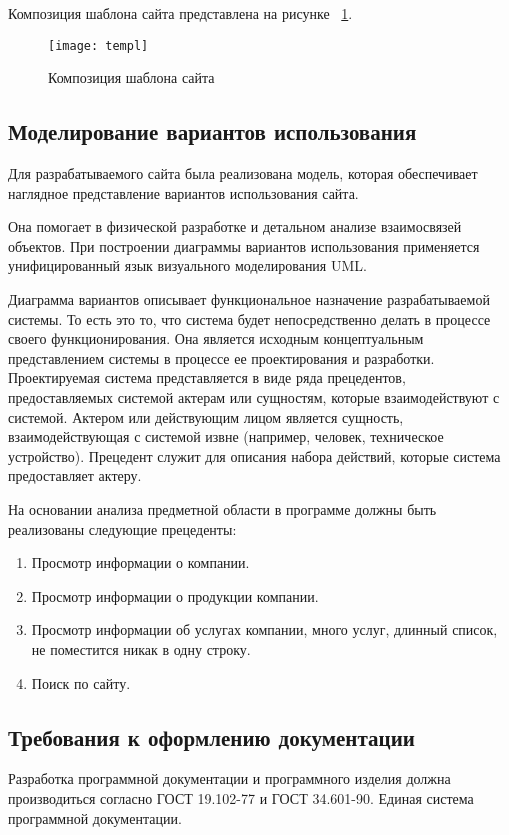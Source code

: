 Композиция шаблона сайта представлена на рисунке ~\ref{templ:image}.

\begin{figure}[ht]
\texttt{[image: templ]}
\caption{Композиция шаблона сайта}
\label{templ:image}
\end{figure}

\subsection{Моделирование вариантов использования}

Для разрабатываемого сайта была реализована модель, которая обеспечивает наглядное представление вариантов использования сайта.

Она помогает в физической разработке и детальном анализе взаимосвязей объектов. При построении диаграммы вариантов использования применяется унифицированный язык визуального моделирования UML.

Диаграмма вариантов описывает функциональное назначение разрабатываемой системы. То есть это то, что система будет непосредственно делать в процессе своего функционирования. Она является исходным концептуальным представлением системы в процессе ее проектирования и разработки. Проектируемая система представляется в виде ряда прецедентов, предоставляемых системой актерам или сущностям, которые взаимодействуют с системой. Актером или действующим лицом является сущность, взаимодействующая с системой извне (например, человек, техническое устройство). Прецедент служит для описания набора действий, которые система предоставляет актеру.

На основании анализа предметной области в программе должны быть реализованы следующие прецеденты:
\begin{enumerate}
\item Просмотр информации о компании.
\item Просмотр информации о продукции компании.
\item Просмотр информации об услугах компании, много услуг, длинный список, не поместится никак в одну строку.
\item Поиск по сайту.
\end{enumerate}

\subsection{Требования к оформлению документации}

Разработка программной документации и программного изделия должна производиться согласно ГОСТ 19.102-77 и ГОСТ 34.601-90. Единая система программной документации.
